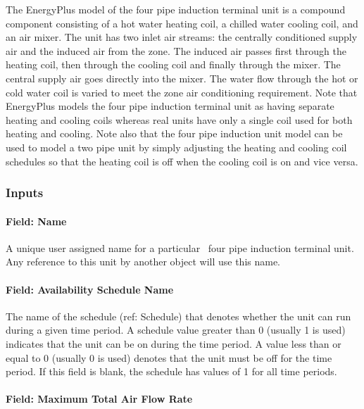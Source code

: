The EnergyPlus model of the four pipe induction terminal unit is a compound component consisting of a hot water heating coil, a chilled water cooling coil, and an air mixer. The unit has two inlet air streams: the centrally conditioned supply air and the induced air from the zone. The induced air passes first through the heating coil, then through the cooling coil and finally through the mixer. The central supply air goes directly into the mixer. The water flow through the hot or cold water coil is varied to meet the zone air conditioning requirement. Note that EnergyPlus models the four pipe induction terminal unit as having separate heating and cooling coils whereas real units have only a single coil used for both heating and cooling. Note also that the four pipe induction unit model can be used to model a two pipe unit by simply adjusting the heating and cooling coil schedules so that the heating coil is off when the cooling coil is on and vice versa.

\subsubsection{Inputs}\label{inputs-9-000}

\paragraph{Field: Name}\label{field-name-9-000}

A unique user assigned name for a particular~ four pipe induction terminal unit. Any reference to this unit by another object will use this name.

\paragraph{Field: Availability Schedule Name}\label{field-availability-schedule-name-9}

The name of the schedule (ref: Schedule) that denotes whether the unit can run during a given time period. A schedule value greater than 0 (usually 1 is used) indicates that the unit can be on during the time period. A value less than or equal to 0 (usually 0 is used) denotes that the unit must be off for the time period. If this field is blank, the schedule has values of 1 for all time periods.

\paragraph{Field: Maximum Total Air Flow Rate}\label{field-maximum-total-air-flow-rate}

